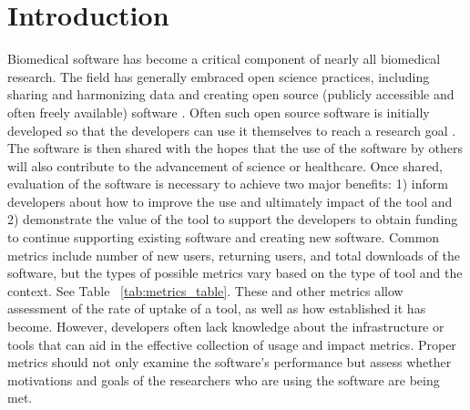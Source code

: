 \documentclass{article}
\begin{document}


\section{Introduction} Biomedical software has become a critical component of nearly all biomedical research.  The field has generally embraced open science practices, including sharing and harmonizing data and creating open source (publicly accessible and often freely available) software \cite{green_strategic_2020, levet_developing_2021, itcr_open-source_2021, merow_better_2023}. Often such open source software is initially developed so that the developers can use it themselves to reach a research goal \cite{bitzer_intrinsic_2007}. The software is then shared with the hopes that the use of the software by others will also contribute to the advancement of science or healthcare. Once shared, evaluation of the software is necessary to achieve two major benefits: 1) inform developers about how to improve the use and ultimately impact of the tool and 2) demonstrate the value of the tool to support the developers to obtain funding to continue supporting existing software and creating new software. Common metrics include number of new users, returning users, and total downloads of the software, but the types of possible metrics vary based on the type of tool and the context. See Table ~\ref{tab:metrics_table}. These and other metrics allow assessment of the rate of uptake of a tool, as well as how established it has become. However, developers often lack knowledge about the infrastructure or tools that can aid in the effective collection of usage and impact metrics. Proper metrics should not only examine the software's performance but assess whether motivations and goals of the researchers who are using the software are being met.
\end{document}
